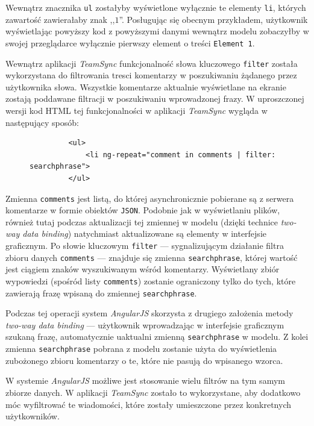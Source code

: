 \documentclass[polish,a4paper,twoside]{ppfcmthesis}
\begin{document}
Wewnątrz znacznika \texttt{ul} zostałyby wyświetlone wyłącznie te elementy \texttt{li}, których zawartość zawierałaby znak ,,$1$''. Posługując się obecnym przykładem, użytkownik wyświetlając powyższy kod z powyższymi danymi wewnątrz modelu zobaczyłby w swojej przeglądarce wyłącznie pierwszy element o treści \texttt{Element 1}.

Wewnątrz aplikacji \emph{TeamSync} funkcjonalność słowa kluczowego \texttt{filter} została wykorzystana do filtrowania tresci komentarzy w poszukiwaniu żądanego przez użytkownika słowa. Wszystkie komentarze aktualnie wyświetlane na ekranie zostają poddawane filtracji w poszukiwaniu wprowadzonej frazy. W uproszczonej wersji kod HTML tej funkcjonalności w aplikacji \emph{TeamSync} wygląda w następujący sposób:

\begin{figure}[htb]
\begin{verbatim}
         <ul>
             <li ng-repeat="comment in comments | filter: searchphrase">
         </ul>
\end{verbatim}
\end{figure}

Zmienna \texttt{comments} jest listą, do której asynchronicznie pobierane są z serwera komentarze w formie obiektów \texttt{JSON}. Podobnie jak w wyświetlaniu plików, również tutaj podczas aktualizacji tej zmiennej w modelu (dzięki technice \emph{two-way data binding}) natychmiast aktualizowane są elementy w interfejsie graficznym. Po słowie kluczowym \texttt{filter} --- sygnalizującym działanie filtra zbioru danych \texttt{comments} --- znajduje się zmienna \texttt{searchphrase}, której wartość jest ciągiem znaków wyszukiwanym wśród komentarzy. Wyświetlany zbiór wypowiedzi (spośród listy \texttt{comments}) zostanie ograniczony tylko do tych, które zawierają frazę wpisaną do zmiennej \texttt{searchphrase}.

Podczas tej operacji system \emph{AngularJS} skorzysta z drugiego założenia metody \emph{two-way data binding} --- użytkownik wprowadzając w interfejsie graficznym szukaną frazę, automatycznie uaktualni zmienną \texttt{searchphrase} w modelu. Z kolei zmienna \texttt{searchphrase} pobrana z modelu zostanie użyta do wyświetlenia zubożonego zbioru komentarzy o te, które nie pasują do wpisanego wzorca.

W systemie \emph{AngularJS} możliwe jest stosowanie wielu filtrów na tym samym zbiorze danych. W aplikacji \emph{TeamSync} zostało to wykorzystane, aby dodatkowo móc wyfiltrować te wiadomości, które zostały umieszczone przez konkretnych użytkowników.
\end{document}

